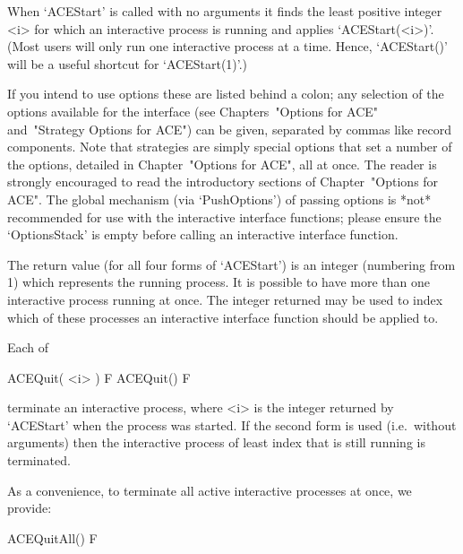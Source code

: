 When `ACEStart' is  called  with  no  arguments  it  finds  the  least
positive integer <i> for which an interactive process is  running  and
applies `ACEStart(<i>)'. (Most users will  only  run  one  interactive
process at a time. Hence, `ACEStart()' will be a useful  shortcut  for
`ACEStart(1)'.)

If you intend to use options these are  listed  behind  a  colon;  any
selection  of  the  options   available   for   the   interface   (see
Chapters~"Options for ACE" and~"Strategy  Options  for  ACE")  can  be
given,  separated  by  commas  like  record  components.   Note   that
strategies are simply  special  options  that  set  a  number  of  the
options, detailed in Chapter~"Options  for  ACE",  all  at  once.  The
reader is strongly encouraged to read  the  introductory  sections  of
Chapter~"Options for ACE". The global mechanism (via `PushOptions') of
passing options is *not* recommended  for  use  with  the  interactive
{\ACE} interface functions; please ensure the `OptionsStack' is  empty
before calling an interactive {\ACE} interface function.

The return value (for all four forms  of  `ACEStart')  is  an  integer
(numbering from  1)  which  represents  the  running  process.  It  is
possible to have more than one interactive process  running  at  once.
The integer returned may be used to index which of these processes  an
interactive {\ACE} interface function should be applied to.

Each of

\>ACEQuit( <i> ) F
\>ACEQuit() F

terminate an interactive {\ACE} process,  where  <i>  is  the  integer
returned by `ACEStart' when the process was  started.  If  the  second
form is used (i.e.~without arguments) then the interactive process  of
least index that is still running is terminated.

As a convenience, to terminate all active interactive {\ACE} processes
at once, we provide:

\>ACEQuitAll() F

\enditems


